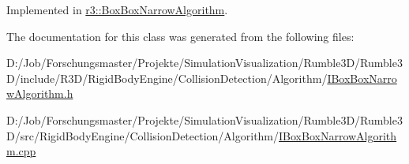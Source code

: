 Implemented in \mbox{\hyperlink{classr3_1_1_box_box_narrow_algorithm_a200098ad4e6e2381f58856002a2d5dec}{r3\+::\+Box\+Box\+Narrow\+Algorithm}}.



The documentation for this class was generated from the following files\+:\begin{DoxyCompactItemize}
\item 
D\+:/\+Job/\+Forschungsmaster/\+Projekte/\+Simulation\+Visualization/\+Rumble3\+D/\+Rumble3\+D/include/\+R3\+D/\+Rigid\+Body\+Engine/\+Collision\+Detection/\+Algorithm/\mbox{\hyperlink{_i_box_box_narrow_algorithm_8h}{I\+Box\+Box\+Narrow\+Algorithm.\+h}}\item 
D\+:/\+Job/\+Forschungsmaster/\+Projekte/\+Simulation\+Visualization/\+Rumble3\+D/\+Rumble3\+D/src/\+Rigid\+Body\+Engine/\+Collision\+Detection/\+Algorithm/\mbox{\hyperlink{_i_box_box_narrow_algorithm_8cpp}{I\+Box\+Box\+Narrow\+Algorithm.\+cpp}}\end{DoxyCompactItemize}
